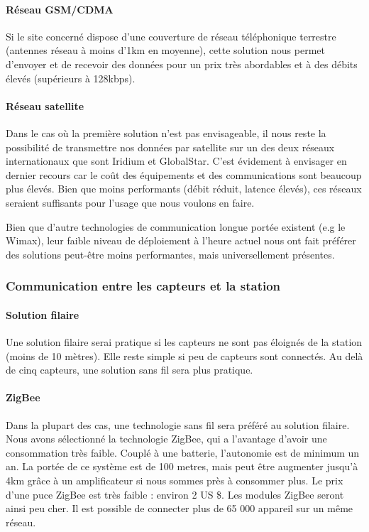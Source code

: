 \paragraph{Réseau GSM/CDMA}

Si le site concerné dispose d’une couverture de réseau téléphonique terrestre (antennes réseau à moins d’1km en moyenne), cette solution nous permet d’envoyer et de recevoir des données pour un prix très abordables et à des débits élevés (supérieurs à 128kbps).

\paragraph{Réseau satellite}

Dans le cas où la première solution n’est pas envisageable, il nous reste la possibilité de transmettre nos données par satellite sur un des deux réseaux internationaux que sont Iridium et GlobalStar. C’est évidement à envisager en dernier recours car le coût des équipements et des communications sont beaucoup plus élevés. Bien que moins performants (débit réduit, latence élevés), ces réseaux seraient suffisants pour l’usage que nous voulons en faire.

Bien que d’autre technologies de communication longue portée existent (e.g le Wimax), leur faible niveau de déploiement à l’heure actuel nous ont fait préférer des solutions peut-être moins performantes, mais universellement présentes.

\subsubsection{Communication entre les capteurs et la station}

\paragraph{Solution filaire}
Une solution filaire serai pratique si les capteurs ne sont pas éloignés de la station (moins de 10 mètres). Elle reste simple si peu de capteurs sont connectés.
Au delà de cinq capteurs, une solution sans fil sera plus pratique.\\

\paragraph{ZigBee}

Dans la plupart des cas, une technologie sans fil sera préféré au solution filaire. Nous avons sélectionné la technologie ZigBee, qui a l’avantage d’avoir une consommation très faible. Couplé à une batterie, l’autonomie est de minimum un an. 
La portée de ce système est de 100 metres, mais peut être augmenter jusqu’à 4km grâce à un amplificateur si nous sommes près à consommer plus. Le prix d’une puce ZigBee est très faible : environ 2 US \$. Les modules ZigBee seront ainsi peu cher.
Il est possible de connecter plus de 65 000 appareil sur un même réseau.\\

